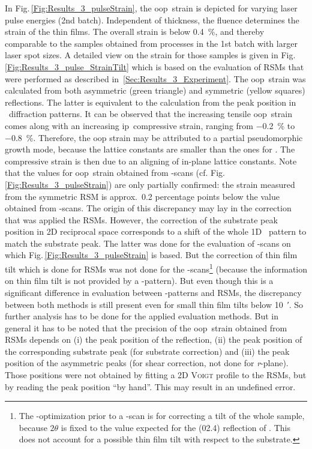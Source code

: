 In Fig.\,\ref{Fig:Results_3_pulseStrain}, the \gls{oop}\ strain is depicted for varying laser pulse energies (2nd batch).
Independent of thickness, the fluence determines the strain of the thin films.
The overall strain is below \qty{0.4}{\percent}, and thereby comparable to the samples obtained from processes in the 1st batch with larger laser spot sizes.
A detailed view on the strain for those samples is given in Fig.\,\ref{Fig:Results_3_pulse_StrainTilt} which is based on the evaluation of \glspl{RSM} that were performed as described in~\ref{Sec:Results_3_Experiment}.
The \gls{oop}\ strain was calculated from both asymmetric (green triangle) and symmetric (yellow squares) reflections.
The latter is equivalent to the calculation from the peak position in \thetaomega\ diffraction patterns.
It can be observed that the increasing tensile \gls{oop}\ strain comes along with an increasing \gls{ip}\ compressive strain, ranging from \qty{-0.2}{\percent} to \qty{-0.8}{\percent}.
Therefore, the \gls{oop} strain may be attributed to a partial pseudomorphic growth mode, because the  lattice constants are smaller than the ones for \cro.
The compressive strain is then due to an aligning of in-plane lattice constants.
Note that the values for \gls{oop}\ strain obtained from \thetaomega-scans (cf. Fig.\,\ref{Fig:Results_3_pulseStrain}) are only partially confirmed:
the strain measured from the symmetric \gls{RSM} is approx.\ 0.2 percentage points below the value obtained from \thetaomega-scans.
The origin of this discrepancy may lay in the correction that was applied the \glspl{RSM}.
However, the correction of the substrate peak position in 2D reciprocal space corresponds to a shift of the whole 1D \thetaomega\ pattern to match the substrate peak.
The latter was done for the evaluation of \thetaomega-scans on which Fig.\,\ref{Fig:Results_3_pulseStrain} is based.
But the correction of thin film tilt which is done for \glspl{RSM} was not done for the \thetaomega-scans\footnote{
    The \textomega-optimization prior to a \thetaomega-scan is for correcting a tilt of the whole sample, because $2\theta$ is fixed to the value expected for the (02.4) reflection of .
    This does not account for a possible thin film tilt with respect to the substrate.
}
(because the information on thin film tilt is not provided by a \thetaomega-pattern).
But even though this is a significant difference in evaluation between \thetaomega-patterns and \glspl{RSM}, the discrepancy between both methods is still present even for small thin film tilts below \qty{10}{\arcminute}.
So further analysis has to be done for the applied evaluation methods.
But in general it has to be noted that the precision of the \gls{oop}\ strain obtained from \glspl{RSM} depends on (i) the peak position of the reflection, (ii) the peak position of the corresponding substrate peak (for substrate correction) and (iii) the peak position of the asymmetric peaks (for shear correction, not done for \textit{r}-plane).
Those positions were not obtained by fitting a 2D \textsc{Voigt} profile to the \glspl{RSM}, but by reading the peak position \enquote{by hand}.
This may result in an undefined error.

